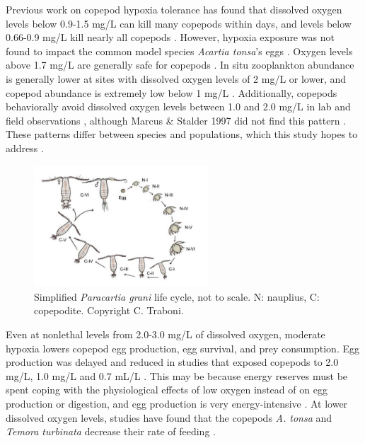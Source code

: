 \documentclass[12pt,twoside]{reedthesis}
\begin{document}
Previous work on copepod hypoxia tolerance has found that dissolved oxygen levels below 0.9-1.5 mg/L can kill many copepods within days, and levels below 0.66-0.9 mg/L kill nearly all copepods \autocite{He2021, Marcus2004, Stalder1997, Grodzins2016}. However, hypoxia exposure was not found to impact the common model species \textit{Acartia tonsa}'s eggs \autocite{Invidia2004}. Oxygen levels above 1.7 mg/L are generally safe for copepods \autocite{Grodzins2016}. In situ zooplankton abundance is generally lower at sites with dissolved oxygen levels of 2 mg/L or lower, and copepod abundance is extremely low below 1 mg/L \autocite{Keister2020, Roman1993}. Additionally, copepods behaviorally avoid dissolved oxygen levels between 1.0 and 2.0 mg/L in lab and field observations \autocite{Keister2020, Roman1993, He2021, Elliott2012, Keister2013}, although Marcus \& Stalder 1997 did not find this pattern \autocite{Stalder1997}. These patterns differ between species and populations, which this study hopes to address \autocite{Grodzins2016}. 

\begin{figure}
	\begin{center}
		\includegraphics[width=0.58\textwidth]{Fig_Life_cycle}
		\caption[Life cycle of copepods]{\footnotesize{Simplified \textit{Paracartia grani} life cycle, not to scale. N: nauplius, C: copepodite. Copyright C. Traboni. }} %
		\label{LifeCycle}
	\end{center}
\end{figure} 

Even at nonlethal levels from 2.0-3.0 mg/L of dissolved oxygen, moderate hypoxia lowers copepod egg production, egg survival, and prey consumption. Egg production was delayed and reduced in studies that exposed copepods to 2.0 mg/L, 1.0 mg/L and 0.7 mL/L \autocite{Marcus2004, Richmond2006, Roman1993}. This may be because energy reserves must be spent coping with the physiological effects of low oxygen instead of on egg production or digestion, and egg production is very energy-intensive \autocite{Marcus2004, Elliott2013, Lutz1992, Stalder1997, Roff1992}. At lower dissolved oxygen levels, studies have found that the copepods \textit{A. tonsa} and \textit{Temora turbinata} decrease their rate of feeding \autocite{He2021, Elliott2013}. 
\end{document}
